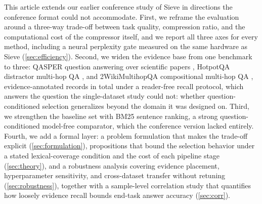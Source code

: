 \documentclass[pdflatex,sn-basic]{sn-jnl}
\theoremstyle{remark}
\newcommand{\method}{Sieve}
\begin{document}
This article extends our earlier conference study of \method{} in
directions the conference format could not accommodate. First, we
reframe the evaluation around a three-way trade-off between task
quality, compression ratio, and the computational cost of the
compressor itself, and we report all three axes for every method,
including a neural perplexity gate measured on the same hardware as
\method{} (\autoref{sec:efficiency}). Second, we widen the evidence
base from one benchmark to three: QASPER question answering over
scientific papers \citep{dasigi2021qasper}, HotpotQA distractor
multi-hop QA \citep{yang2018hotpotqa}, and 2WikiMultihopQA
compositional multi-hop QA \citep{ho2020wiki}, \TotalRecords{}
evidence-annotated records in total under a reader-free recall
protocol, which answers the question the single-dataset study could
not: whether question-conditioned selection generalizes beyond the
domain it was designed on. Third, we strengthen the baseline set with
BM25 sentence ranking, a strong question-conditioned model-free
comparator, which the conference version lacked entirely. Fourth, we
add a formal layer: a problem formulation that makes the trade-off
explicit (\autoref{sec:formulation}), propositions that bound the
selection behavior under a stated lexical-coverage condition and the
cost of each pipeline stage (\autoref{sec:theory}), and a robustness
analysis covering evidence placement, hyperparameter sensitivity, and
cross-dataset transfer without retuning (\autoref{sec:robustness}),
together with a sample-level correlation study that quantifies how
loosely evidence recall bounds end-task answer accuracy
(\autoref{sec:corr}).
\end{document}
